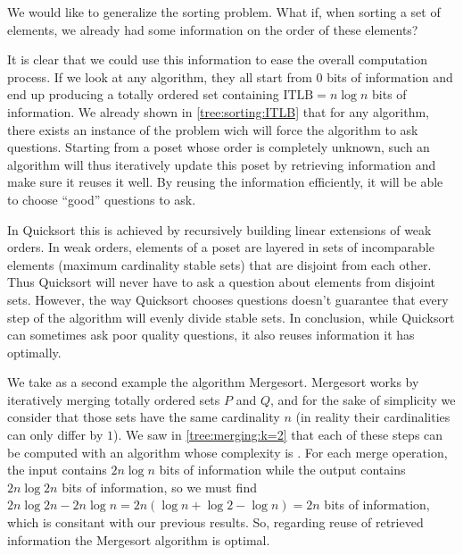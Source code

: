 
We would like to generalize the sorting problem. What if, when sorting a set of
elements, we already had some information on the order of these elements?


It is clear that we could use this information to ease the overall computation
process. If we look at any  algorithm, they all start from
$0$ bits of information and end up producing a totally ordered set containing
$\text{ITLB}= n \log n$ bits of information. We already shown in
\ref{tree:sorting:ITLB} that for any algorithm, there exists an instance of the
problem wich will force the algorithm to ask  questions.
Starting from a poset whose order is completely unknown, such an algorithm will
thus iteratively update this poset by retrieving information and make sure it
reuses it well. By reusing the information efficiently, it will be able to
choose ``good'' questions to ask.


In Quicksort this is achieved by recursively building linear extensions of weak
orders. In weak orders, elements of a poset are layered in sets of incomparable
elements (maximum cardinality stable sets) that are disjoint from each other.
Thus Quicksort will never have to ask a question about elements from disjoint
sets. However, the way Quicksort chooses questions doesn't guarantee that every
step of the algorithm will evenly divide stable sets. In conclusion, while
Quicksort can sometimes ask poor quality questions, it also reuses information
it has optimally.


We take as a second example the algorithm Mergesort. Mergesort works by
iteratively merging totally ordered sets $P$ and $Q$, and for the sake of
simplicity we consider that those sets have the same cardinality $n$  (in
reality their cardinalities can only differ by $1$). We saw in
\ref{tree:merging:k=2} that each of these steps can be computed with an
algorithm whose complexity is . For each merge operation, the input
contains $2n \log n$ bits of information while the output contains $2n \log 2n$
bits of information, so we must find $2n \log 2n - 2n \log n = 2n (\log n +
\log 2 - \log n) = 2n$ bits of information, which is consitant with our
previous results. So, regarding reuse of retrieved information the Mergesort
algorithm is optimal.

